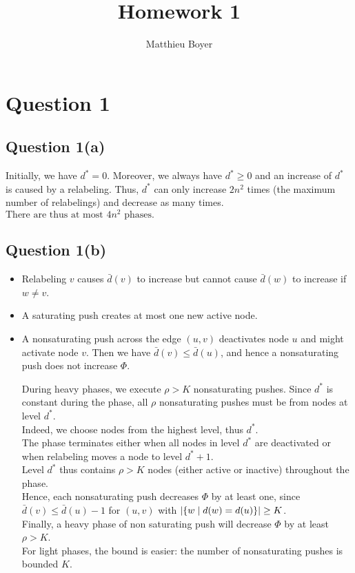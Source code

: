 \documentclass[math]{cours}
\title{Homework 1}
\author{Matthieu Boyer}
\begin{document}
\maketitle
\section{Question 1}
\subsection{Question 1(a)}
Initially, we have $d^{*} = 0$.
Moreover, we always have $d^{*} \geq 0$ and an increase of $d^{*}$ is caused by a relabeling.
Thus, $d^{*}$ can only increase $2n^{2}$ times (the maximum number of relabelings) and decrease as many times.\\
$\boxed{\text{There are thus at most } 4n^{2} \text{ phases.}}$

\subsection{Question 1(b)}
\begin{itemize}
	\item Relabeling $v$ causes $\bar{d}(v)$ to increase but cannot cause $\bar{d}(w)$ to increase if $w \neq v$.\\
	\item A saturating push creates at most one new active node.\\
	\item A nonsaturating push across the edge $(u, v)$ deactivates node $u$ and might activate node $v$.
		Then we have $\bar{d}(v) \leq \bar{d}(u)$, and hence a nonsaturating push does not increase $\Phi$.

		\medskip

		During heavy phases, we execute $\rho > K$ nonsaturating pushes.
		Since $d^{*}$ is constant during the phase, all $\rho$ nonsaturating pushes must be from nodes at level $d^{*}$.\\
		Indeed, we choose nodes from the highest level, thus $d^{*}$.\\
		The phase terminates either when all nodes in level $d^{*}$ are deactivated or when relabeling moves a node to level $d^{*} + 1$.\\
		Level $d^{*}$ thus contains $\rho > K$ nodes (either active or inactive) throughout the phase.\\
		Hence, each nonsaturating push decreases $\Phi$ by at least one, since $\bar{d}(v) \leq \bar{d}(u) - 1$ for $(u, v)$ with $\left|\left\{w\mid d(w) = d(u)\right\}\right| \geq K$.\\
		Finally, a heavy phase of non saturating push will decrease $\Phi$ by at least $\rho > K$.\\

		For light phases, the bound is easier: the number of nonsaturating pushes is bounded $K$.
\end{itemize}
\end{document}
